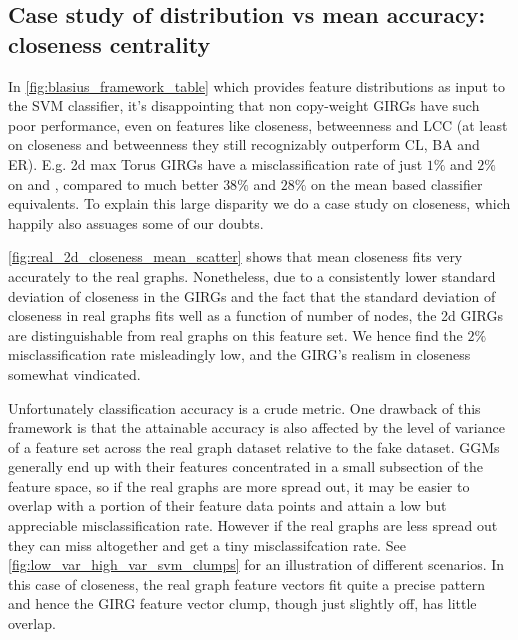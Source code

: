 \subsection{Case study of distribution vs mean accuracy: closeness centrality}
In \cref{fig:blasius_framework_table} which provides feature distributions as input to the SVM classifier, it's disappointing that non copy-weight GIRGs have such poor performance, even on  features like closeness, betweenness and LCC (at least on closeness and betweenness they still recognizably outperform CL, BA and ER). E.g. 2d max Torus GIRGs have a misclassification rate of just $1\%$ and $2\%$ on  and , compared to much better $38\%$ and $28\%$ on the mean based classifier equivalents. To explain this large disparity we do a case study on closeness, which happily also assuages some of our doubts.

\cref{fig:real_2d_closeness_mean_scatter} shows that mean closeness fits very accurately to the real graphs. Nonetheless, due to a consistently lower standard deviation of closeness in the GIRGs and the fact that the standard deviation of closeness in real graphs fits well as a function of number of nodes, the 2d GIRGs are distinguishable from real graphs on this feature set. We hence find the $2\%$ misclassification rate misleadingly low, and the GIRG's realism in closeness somewhat vindicated.


Unfortunately classification accuracy is a crude metric. One drawback of this framework is that the attainable accuracy is also affected by the level of variance of a feature set across the real graph dataset relative to the fake dataset. GGMs generally end up with their features concentrated in a small subsection of the feature space, so if the real graphs are more spread out, it may be easier to overlap with a portion of their feature data points and attain a low but appreciable misclassification rate. However if the real graphs are less spread out they can miss altogether and get a tiny misclassifcation rate. See \cref{fig:low_var_high_var_svm_clumps} for an illustration of different scenarios. In this case of closeness, the real graph feature vectors fit quite a precise pattern and hence the GIRG feature vector clump, though just slightly off, has little overlap.

